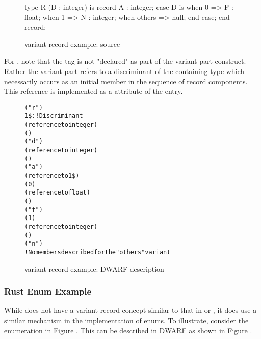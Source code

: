 \begin{figure}[ht]
\begin{nlnlisting}
   type R (D : integer) is
      record
         A : integer;
         case D is
            when 0 =>
               F : float;
            when 1 =>
               N : integer;
            when others =>
               null;
         end case;
      end record;
\end{nlnlisting}
\caption{\Ada{} variant record example: source}
\label{fig:adavariantrecordexamplesource}
\end{figure}

\bb
For \Ada, note that the tag is not "declared" as part
of the variant part construct. Rather the variant part
refers to a discriminant of the containing type which
necessarily occurs as an initial member in the sequence
of record components. This reference is implemented as
a \DWATdiscr{} attribute of the \DWTAGvariantpart{} entry.
\eb

\begin{figure}[ht]
\begin{dwflisting}
\begin{alltt}
    \DWTAGstructuretype
        \DWATname("r")
1\$:     \DWTAGmember                             ! Discriminant
           \DWATtype(reference to integer)
           \DWATdatamemberlocation()
           \DWATname("d")
       \DWTAGmember
           \DWATtype(reference to integer)
           \DWATdatamemberlocation()
           \DWATname("a")
       \DWTAGvariantpart
           \DWATdiscr(reference to 1\$)
           \DWTAGvariant
               \DWATdiscrvalue(0)
               \DWTAGmember
                  \DWATtype(reference to float)
                  \DWATdatamemberlocation()
                  \DWATname("f")
          \DWTAGvariant
              \DWATdiscrvalue(1)
              \DWTAGmember
                  \DWATtype(reference to integer)
                  \DWATdatamemberlocation()
                  \DWATname("n")
          \DWTAGvariant
              ! No members described for the "others" variant
\end{alltt}
\end{dwflisting}
\caption{\Ada{} variant record example: DWARF description}
\label{fig:adavariantrecordexampledwarfdescription}
\end{figure}

\bb
\subsubsection{Rust Enum Example}
\label{app:rustenumexample}
While \Rust{} does not have a variant record concept similar to that 
in \Pascal{} or \Ada{}, it does use a similar mechanism in the implementation
of enums. To illustrate, consider the enumeration
in Figure . This can be described in
DWARF as shown in Figure .
\eb

